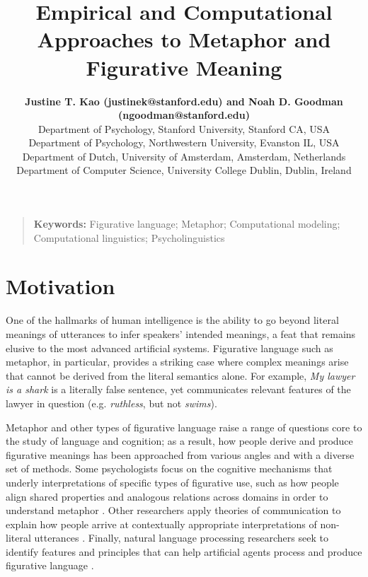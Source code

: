 \documentclass[10pt,letterpaper]{article}
\title{Empirical and Computational Approaches to Metaphor and Figurative Meaning}
\author{{\large \bf Justine T. Kao (justinek@stanford.edu) and Noah D. Goodman (ngoodman@stanford.edu)} \\ 
  Department of Psychology, 
  Stanford University, Stanford CA, USA 
  \AND{
\large \bf Francisco Maravilla (fmaravil@gmail.com) and Dedre Gentner (gentner@northwestern.edu)} \\
  Department of Psychology, Northwestern University,
  Evanston IL, USA
  \AND{\large \bf Gerard Steen (g.j.steen@uva.nl)} \\
  Department of Dutch, University of Amsterdam,
Amsterdam, Netherlands
\AND{\large \bf Tony Veale (tony.veale@ucd.ie)} \\
  Department of Computer Science, University College Dublin,
  Dublin, Ireland
}
\begin{document}
\maketitle

\begin{quote}
\small
\textbf{Keywords:} 
Figurative language; Metaphor; Computational modeling; Computational linguistics; Psycholinguistics
\end{quote}

\section{Motivation}
One of the hallmarks of human intelligence is the ability to go beyond literal meanings of utterances to infer speakers' intended meanings, a feat that remains elusive to the most advanced artificial systems. Figurative language such as metaphor, in particular, provides a striking case where complex meanings arise that cannot be derived from the literal semantics alone. For example, \emph{My lawyer is a shark} is a literally false sentence, yet communicates relevant features of the lawyer in question (e.g. \emph{ruthless}, but not \emph{swims}). 


Metaphor and other types of figurative language raise a range of questions core to the study of language and cognition;
as a result, how people derive and produce figurative meanings has been approached from various angles and with a diverse set of methods. Some psychologists focus on the cognitive mechanisms that underly interpretations of specific types of figurative use, such as how people align shared properties and analogous relations across domains in order to understand metaphor \cite{gentner1983structure}. 
Other researchers apply theories of communication to explain how people arrive at contextually appropriate interpretations of non-literal utterances \cite{steen2015developing, kao2014nonliteral}. Finally, natural language processing researchers seek to identify features and principles that can help artificial agents process and produce figurative language \cite{veale2007comprehending}.
\end{document}
